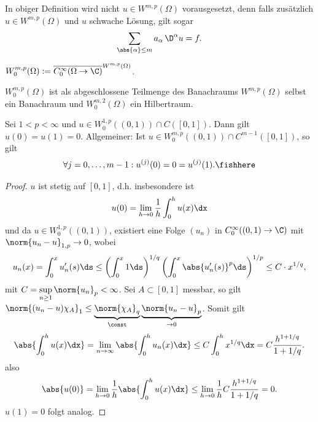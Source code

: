 In obiger Definition wird nicht $u\in W^{m,p}(\Omega)$ vorausgesetzt, denn
falls zusätzlich $u\in W^{m,p}(\Omega)$ und $u$ schwache Lösung, gilt sogar
\begin{align*}
\sum_{\abs{\alpha}\le m} a_\alpha\, \D^\alpha u = f.
\end{align*}

\newcommand{\WO}{W_0}
\begin{defn}
\label{defn:7.33}
$\WO^{m,p}(\Omega) :=
\overline{C_0^\infty(\Omega\to\C)}^{W^{m,p}(\Omega)}$.\fishhere
\end{defn}

$\WO^{m,p}(\Omega)$ ist als abgeschlossene Teilmenge des Banachraums
$W^{m,p}(\Omega)$ selbst ein Banachraum und $\WO^{m,2}(\Omega)$ ein Hilbertraum.


\begin{prop}[Veranschaulichung]
\label{prop:7.34}
Sei $1<p<\infty$ und $u\in W_0^{1,p}((0,1))\cap C([0,1])$. Dann gilt $u(0) =
u(1)=0$. Allgemeiner: Ist $u\in W_0^{m,p}((0,1))\cap C^{m-1}([0,1])$, so gilt
\begin{align*}
\forall j=0,\ldots,m-1 : u^{(j)}(0) = 0 = u^{(j)}(1).\fishhere
\end{align*}
\end{prop}
\begin{proof}
$u$ ist stetig auf $[0,1]$, d.h. insbesondere ist
\begin{align*}
u(0) =\lim\limits_{h\to0}\frac{1}{h} \int_0^h u(x)\dx
\end{align*}
und da $u\in W_0^{1,p}((0,1))$, existiert eine Folge $(u_n)$ in
$C_0^\infty((0,1)\to\C)$ mit $\norm{u_n-u}_{1,p}\to 0$, wobei
\begin{align*}
u_n(x) = \int_0^x u_n'(s)\ds \le
\left(\int_0^x 1\ds\right)^{1/q}
\left(\int_0^x \abs{u_n'(s)}^p\ds\right)^{1/p}
\le C\cdot x^{1/q},
\end{align*}
mit $C=\sup\limits_{n\ge 1} \norm{u_n}_p < \infty$. Sei $A\subset[0,1]$
messbar, so gilt $\norm{(u_n-u)\chi_A}_1 \le
\underbrace{\norm{\chi_A}_q}_{\const}\underbrace{\norm{u_n-u}_p}_{\to 0}$. Somit
gilt
\begin{align*}
\abs{\int_0^h u(x)\dx} = \lim\limits_{n\to\infty}
\abs{\int_0^h u_n(x)\dx} \le C \int_0^h x^{1/q}\dx = C\frac{h^{1+1/q}}{1+1/q}.
\end{align*}
also
\begin{align*}
\abs{u(0)} = \lim\limits_{h\to 0}\frac{1}{h}
\abs{\int_0^h u(x)\dx} \le
\lim\limits_{h\to 0}\frac{1}{h}
C\frac{h^{1+1/q}}{1+1/q} = 0.
\end{align*}
$u(1)=0$ folgt analog.\qedhere
\end{proof}

